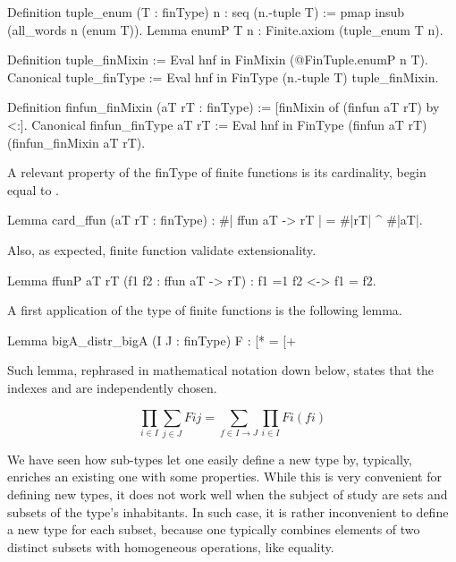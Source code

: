 \begin{coq}{}{}
Definition tuple_enum (T : finType) n : seq (n.-tuple T) :=
  pmap insub (all_words n (enum T)).
Lemma enumP T n : Finite.axiom (tuple_enum T n).

Definition tuple_finMixin := Eval hnf in FinMixin (@FinTuple.enumP n T).
Canonical tuple_finType :=
  Eval hnf in FinType (n.-tuple T) tuple_finMixin.
 
Definition finfun_finMixin (aT rT : finType) :=
  [finMixin of (finfun aT rT) by <:].
Canonical finfun_finType  aT rT :=
  Eval hnf in FinType (finfun aT rT) (finfun_finMixin aT rT).
\end{coq}

A relevant property of the finType of finite functions is its
cardinality, begin equal to .

\begin{coq}{}{}
Lemma card_ffun (aT rT : finType) : #| {ffun aT -> rT} | = #|rT| ^ #|aT|.
\end{coq}

Also, as expected, finite function validate extensionality.

\begin{coq}{}{}
Lemma ffunP aT rT (f1 f2 : {ffun aT -> rT}) : f1 =1 f2 <-> f1 = f2.
\end{coq}

A first application of the type of finite functions is the following
lemma.

\begin{coq}{}{}
Lemma bigA_distr_bigA (I J : finType) F :
  \big[*%
    = \big[+%
\end{coq}

Such lemma, rephrased in mathematical notation down below, 
states that the indexes  and  are independently chosen.

$$
\prod_{i \in I} \sum_{j \in J} F i j = \sum_{f \in I \to J} \prod_{i \in I} F i (f i)
$$

\mcbLEARN{}
\mcbPROVIDE{}
\mcbREQUIRE{}

We have seen how sub-types let one easily define a new type by, typically,
enriches an existing one with some properties.  While this is very
convenient for defining new types, it does not work well when the
subject of study are sets and subsets of the type's inhabitants.
In such case, it is rather inconvenient to define a new type for
each subset, because one typically combines elements of
two distinct subsets with homogeneous operations, like equality.

